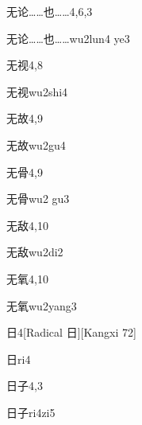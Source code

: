 \begin{entry}{无论……也……}{4,6,3}
  \begin{phonetics}{无论……也……}{wu2lun4 ye3}
  \end{phonetics}
\end{entry}

\begin{entry}{无视}{4,8}
  \begin{phonetics}{无视}{wu2shi4}
  \end{phonetics}
\end{entry}

\begin{entry}{无故}{4,9}
  \begin{phonetics}{无故}{wu2gu4}
  \end{phonetics}
\end{entry}

\begin{entry}{无骨}{4,9}
  \begin{phonetics}{无骨}{wu2 gu3}
  \end{phonetics}
\end{entry}

\begin{entry}{无敌}{4,10}
  \begin{phonetics}{无敌}{wu2di2}
  \end{phonetics}
\end{entry}

\begin{entry}{无氧}{4,10}
  \begin{phonetics}{无氧}{wu2yang3}
  \end{phonetics}
\end{entry}

\begin{entry}{日}{4}[Radical 日][Kangxi 72]
  \begin{phonetics}{日}{ri4}
  \end{phonetics}
\end{entry}

\begin{entry}{日子}{4,3}
  \begin{phonetics}{日子}{ri4zi5}
  \end{phonetics}
\end{entry}

